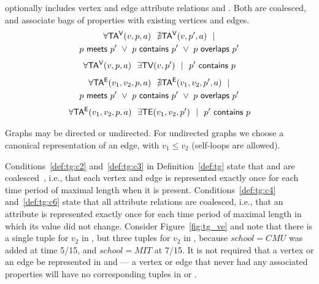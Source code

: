 \begin{definition}
 optionally includes vertex and edge attribute relations \tav
and \tae.  Both are coalesced, and associate bags of properties with
existing vertices and edges.
\begin{multline}
\forall \mathsf{TA^{V}}(v, p, a)~~\nexists \mathsf{TA^{V}}(v, p', a)~~| \\
                       p~\mathsf{meets}~p'~\lor~p~\mathsf{contains}~p'~\lor~p~\mathsf{overlaps}~p'
\label{def:tg:c4}
\end{multline}
\vspace{-0.5cm}
\begin{multline}
\forall \mathsf{TA^{V}}(v, p, a)~~\exists \textsf{TV}(v,p')~~|~~p'~\mathsf{contains}~p
\label{def:tg:c5}
\end{multline}
\vspace{-0.5cm}
\begin{multline}
\forall \mathsf{TA^{E}}(v_1, v_2, p, a)~~\nexists \mathsf{TA^{E}}(v_1, v_2, p', a)~~| \\
                       p~\mathsf{meets}~p'~\lor~p~\mathsf{contains}~p'~\lor~p~\mathsf{overlaps}~p'
\label{def:tg:c6}
\end{multline}
\vspace{-0.5cm}
\begin{multline}
\forall \mathsf{TA^{E}}(v_1, v_2, p, a)~~\exists \textsf{TE}(v_1,v_2,p')~~|~~p'~\mathsf{contains}~p
\label{def:tg:c7}
\end{multline}
\vspace{-0.6cm}
\label{def:tg}
\end{definition}

Graphs may be directed or undirected.  For undirected graphs we choose
a canonical representation of an edge, with $v_1 \leq v_2$ (self-loops
are allowed).

Conditions~\ref{def:tg:c2} and~\ref{def:tg:c3} in
Definition~\ref{def:tg} state that \tv and \te are
coalesced~\cite{DBLP:conf/vldb/BohlenSS96}, i.e., that each vertex and
edge is represented exactly once for each time period of maximal
length when it is present.  Conditions~\ref{def:tg:c4}
and~\ref{def:tg:c6} state that all attribute relations are coalesced,
i.e., that an attribute is represented exactly once for each time
period of maximal length in which its value did not change.  Consider
Figure~\ref{fig:tg_ve} and note that there is a single tuple for $v_2$
in \tv, but three tuples for $v_2$ in \tav, because $school=CMU$ was
added at time 5/15, and $school=MIT$ at 7/15.  It is not required that
a vertex or an edge be represented in \tav and \tae --- a vertex or
edge that never had any associated properties will have no
corresponding tuples in \tav or \tae.

